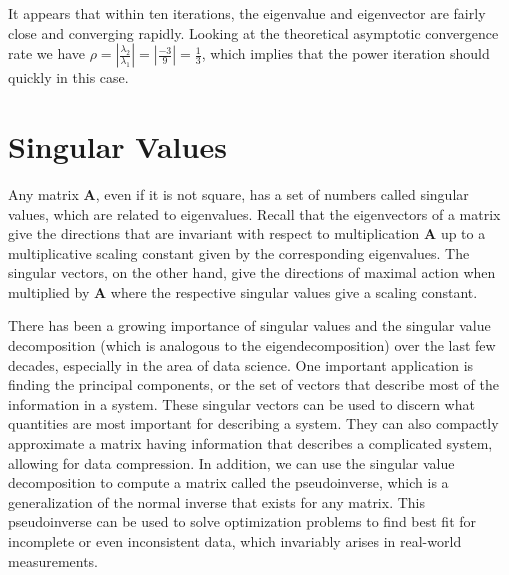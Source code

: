 It appears that within ten iterations, the eigenvalue and eigenvector are fairly close and converging rapidly. Looking at the theoretical asymptotic convergence rate we have $\rho = \left| \frac{\lambda_2}{\lambda_1} \right| = \left| \frac{-3}{9} \right| = \frac{1}{3}$, which implies that the power iteration should quickly in this case.


\section{Singular Values}

Any matrix $\mathbf{A}$, even if it is not square, has a set of numbers called singular values, which are related to eigenvalues. Recall that the eigenvectors of a matrix give the directions that are invariant with respect to multiplication $\mathbf{A}$ up to a multiplicative scaling constant given by the corresponding eigenvalues. The singular vectors, on the other hand, give the directions of maximal action when multiplied by $\mathbf{A}$ where the respective singular values give a scaling constant. 

There has been a growing importance of singular values and the singular value decomposition (which is analogous to the eigendecomposition) over the last few decades, especially in the area of data science. One important application is finding the principal components, or the set of vectors that describe most of the information in a system. These singular vectors can be used to discern what quantities are most important for describing a system. They can also compactly approximate a matrix having information that describes a complicated system, allowing for data compression. In addition, we can use the singular value decomposition to compute a matrix called the pseudoinverse, which is a generalization of the normal inverse that exists for any matrix. This pseudoinverse can be used to solve optimization problems to find best fit for incomplete or even inconsistent data, which invariably arises in real-world measurements.

